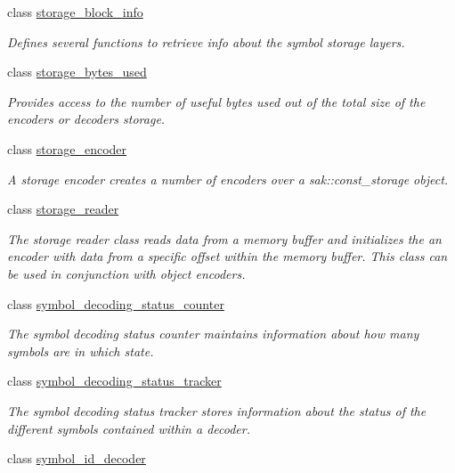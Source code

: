 \begin{DoxyCompactItemize}
class \hyperlink{classkodo_1_1storage__block__info}{storage\-\_\-block\-\_\-info}
\begin{DoxyCompactList}\small\item\em Defines several functions to retrieve info about the symbol storage layers. \end{DoxyCompactList}\item 
class \hyperlink{classkodo_1_1storage__bytes__used}{storage\-\_\-bytes\-\_\-used}
\begin{DoxyCompactList}\small\item\em Provides access to the number of useful bytes used out of the total size of the encoders or decoders storage. \end{DoxyCompactList}\item 
class \hyperlink{classkodo_1_1storage__encoder}{storage\-\_\-encoder}
\begin{DoxyCompactList}\small\item\em A storage encoder creates a number of encoders over a sak\-::const\-\_\-storage object. \end{DoxyCompactList}\item 
class \hyperlink{classkodo_1_1storage__reader}{storage\-\_\-reader}
\begin{DoxyCompactList}\small\item\em The storage reader class reads data from a memory buffer and initializes the an encoder with data from a specific offset within the memory buffer. This class can be used in conjunction with object encoders. \end{DoxyCompactList}\item 
class \hyperlink{classkodo_1_1symbol__decoding__status__counter}{symbol\-\_\-decoding\-\_\-status\-\_\-counter}
\begin{DoxyCompactList}\small\item\em The symbol decoding status counter maintains information about how many symbols are in which state. \end{DoxyCompactList}\item 
class \hyperlink{classkodo_1_1symbol__decoding__status__tracker}{symbol\-\_\-decoding\-\_\-status\-\_\-tracker}
\begin{DoxyCompactList}\small\item\em The symbol decoding status tracker stores information about the status of the different symbols contained within a decoder. \end{DoxyCompactList}\item 
class \hyperlink{classkodo_1_1symbol__id__decoder}{symbol\-\_\-id\-\_\-decoder}

\end{DoxyCompactItemize}
